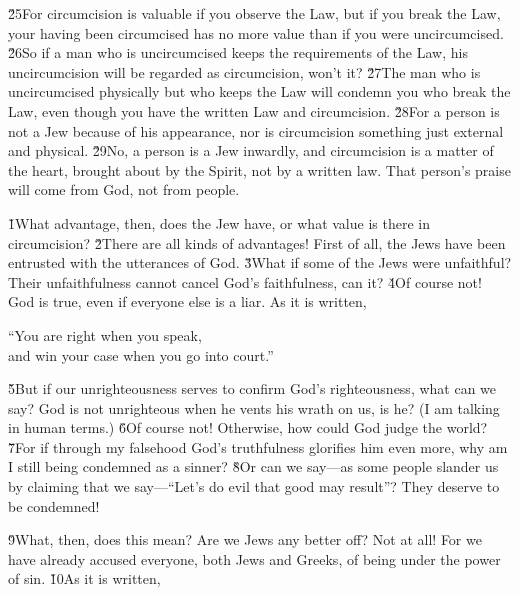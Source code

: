 \v{25}For circumcision is valuable if you observe the Law, but if you break the Law, your having been circumcised has no more value than if you were uncircumcised. \v{26}So if a man who is uncircumcised keeps the requirements of the Law, his uncircumcision will be regarded as circumcision, won't it? \v{27}The man who is uncircumcised physically but who keeps the Law will condemn you who break the Law, even though you have the written Law and circumcision. \v{28}For a person is not a Jew because of his appearance, nor is circumcision something just external and physical. \v{29}No, a person is a Jew inwardly, and circumcision is a matter of the heart, brought about by the Spirit, not by a written law. That person's praise will come from God, not from people.

\v{1}What advantage, then, does the Jew have, or what value is there in circumcision? \v{2}There are all kinds of advantages! First of all, the Jews have been entrusted with the utterances of God. \v{3}What if some of the Jews were unfaithful? Their unfaithfulness cannot cancel God's faithfulness, can it? \v{4}Of course not! God is true, even if everyone else is a liar. As it is written,

\begin{poetry}
\poeml ``You are right when you speak, \\
\poemll    and win your case when you go into court.''
\end{poetry}

\v{5}But if our unrighteousness serves to confirm God's righteousness, what can we say? God is not unrighteous when he vents his wrath on us, is he? (I am talking in human terms.) \v{6}Of course not! Otherwise, how could God judge the world? \v{7}For if through my falsehood God's truthfulness glorifies him even more, why am I still being condemned as a sinner? \v{8}Or can we say---as some people slander us by claiming that we say---``Let's do evil that good may result''? They deserve to be condemned!

\v{9}What, then, does this mean? Are we Jews any better off? Not at all! For we have already accused everyone, both Jews and Greeks, of being under the power of sin. \v{10}As it is written,

